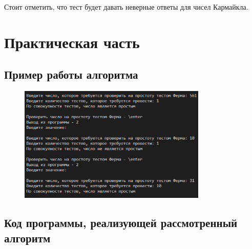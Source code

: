 \documentclass[bachelor, och, labwork]{shiza}
\begin{document}
Стоит отметить, что тест будет давать неверные ответы для чисел Кармайкла.


\section{Практическая часть}
\subsection{Пример работы алгоритма}
\begin{figure}[H]
    \centering
    \includegraphics[width=0.8\textwidth]{pic1.png}
    \caption{}
\end{figure}

    \subsection{Код программы, реализующей рассмотренный алгоритм}
        \inputminted{python}{lab4.py}
\end{document}
